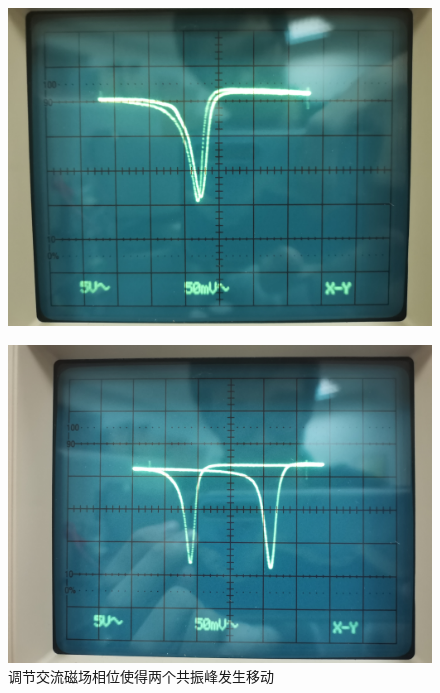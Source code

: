 \documentclass{buaaemp}
\begin{document}
	
	\begin{figure}[!htbp]
	
			\centering
			\includegraphics[width=\linewidth]{image/two.jpg}
   \end{figure}
		\begin{figure}
			\centering
			\includegraphics[width=\linewidth]{image/three.jpg}
		\caption{调节交流磁场相位使得两个共振峰发生移动}
		\label{figure:displacement}
	\end{figure}
 
\end{document}
